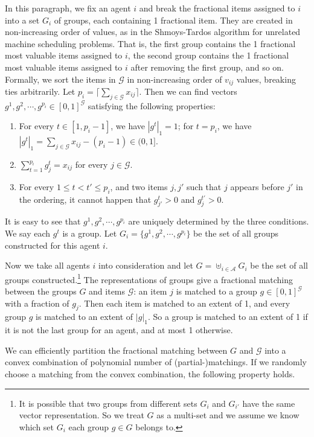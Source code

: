 \documentclass{theoretics}
\newcommand\calA{{\mathcal{A}}}
\newcommand\calG{{\mathcal{G}}}
\newcommand\ceil[1]{{\lceil#1\rceil}}
\begin{document}
    In this paragraph, we fix an agent $i$ and break the fractional items assigned to $i$ into a set $G_i$ of groups, each containing 1 fractional item. They are created in non-increasing order of values, as in the Shmoys-Tardos algorithm for unrelated machine scheduling problems. That is, the first group contains the 1 fractional most valuable items assigned to $i$, the second group contains the 1 fractional most valuable items assigned to $i$ after removing the first group, and so on. Formally, we sort the items in $\calG$ in non-increasing order of $v_{ij}$ values, breaking ties arbitrarily. Let $p_i = \ceil{\sum_{j \in \calG} x_{ij}}$. Then we can find vectors $g^1, g^2, \cdots, g^{p_i} \in [0, 1]^{\calG}$ satisfying the following properties:
    \begin{enumerate}[label = (P\arabic*)]
        \item For every $t \in [1, p_i-1]$, we have $|g^t|_1 = 1$; for $t = p_i$, we have $|g^t|_1 = \sum_{j \in \calG}x_{ij} - (p_i - 1) \in (0, 1]$.
        \item $\sum_{t = 1}^{p_i}g^t_j = x_{ij}$ for every $j \in \calG$.
        \item For every $1 \leq t < t' \leq p_i$, and two items $j, j'$ such that $j$ appears before $j'$ in the ordering, it cannot happen that $g^t_{j'} > 0$ and $g^{t'}_j > 0$.
    \end{enumerate}
    It is easy to see that $g^1, g^2, \cdots, g^{p_i}$ are uniquely determined by the three conditions. We say each $g^t$ is a group. Let $G_i = \{g^1, g^2, \cdots, g^{p_i}\}$ be the set of all groups constructed for this agent $i$. 
    \medskip

    Now we take all agents $i$ into consideration and let $G = \uplus_{i \in \calA}G_i$ be the set of all groups constructed.\footnote{It is possible that two groups from different sets $G_i$ and $G_{i'}$ have the same vector representation. So we treat $G$ as a multi-set and we assume we know which set $G_i$ each group $g \in G$ belongs to.} The representations of groups give a fractional matching between the groups $G$ and items $\calG$: an item $j$ is matched to a group $g \in [0, 1]^{\calG}$ with a fraction of $g_j$.  Then each item is matched to an extent of 1, and every group $g$ is matched to an extent of $|g|_1$. So a group is matched to an extent of 1 if it is not the last group for an agent, and at most 1 otherwise.  
    
    We can efficiently partition the fractional matching between $G$ and $\calG$ into a convex combination of polynomial number of (partial-)matchings.  If we randomly choose a matching from the convex combination, the following property holds. 
\end{document}
